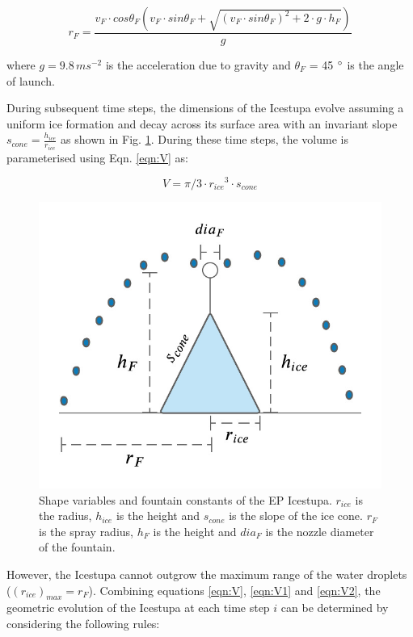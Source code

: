 \documentclass[utf8]{frontiersSCNS} %
\begin{document}
\begin{equation} r_F = \frac{v_F \cdot cos\theta_F (v_F \cdot sin\theta_F + \sqrt{(v_F \cdot sin\theta_F)^{2} + 2
\cdot g \cdot h_F})}{g} \end{equation}

where $g = 9.8\, m s^{-2}$ is the acceleration due to gravity and $\theta_F$ = 45 $\degree$ is the angle of launch.

During subsequent time steps, the dimensions of the Icestupa evolve assuming a uniform ice formation and decay across
its surface area with an invariant slope $s_{cone} = \frac{h_{ice}}{r_{ice}}$ as shown in Fig.  \ref{fig:shape}.
During these time steps, the volume is parameterised using Eqn. \ref{eqn:V} as:

\begin{equation} V = \pi/3 \cdot {r_{ice}}^3 \cdot s_{cone} \label{eqn:V2} \end{equation}

  \begin{figure} \begin{center} \includegraphics[width=10 cm]{Figures/Figure_5.jpg} \end{center} \caption{Shape
variables and fountain constants of the EP Icestupa. $r_{ice}$ is the radius, $h_{ice}$ is the height and $s_{cone}$ is
the slope of the ice cone. $r_F$ is the spray radius, $h_F$ is the height and $dia_F$ is the nozzle diameter of the
fountain.} \label{fig:shape} \end{figure}
  
However, the Icestupa cannot outgrow the maximum range of the water droplets ($(r_{ice})_{max} = r_{F}$). Combining
equations \ref{eqn:V}, \ref{eqn:V1} and \ref{eqn:V2}, the geometric evolution of the Icestupa at each time step $i$ can
be determined by considering the following rules:
\end{document}
